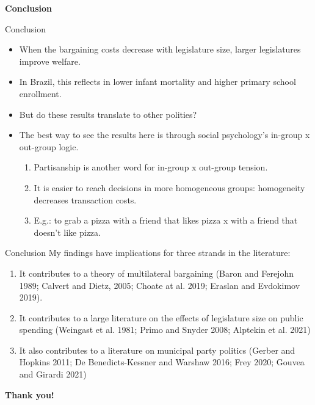 \documentclass[11pt]{beamer}
\begin{document}
\begin{frame}
\begin{center}
\Large{\textbf{Conclusion}}
\end{center}
\end{frame}

\begin{frame}{Conclusion}
\begin{itemize} \itemsep1em
\item When the bargaining costs decrease with legislature size, larger legislatures improve welfare.
\item In Brazil, this reflects in lower infant mortality and higher primary school enrollment. 
\item But do these results translate to other polities?
\item The best way to see the results here is through social psychology's in-group x out-group logic.

\vspace{0.15in}

\begin{enumerate} \itemsep1em
    \item Partisanship is another word for in-group x out-group tension.
    \item It is easier to reach decisions in more homogeneous groups: homogeneity decreases transaction costs.
    \item E.g.: to grab a pizza with a friend that likes pizza x with a friend that doesn't like pizza.
\end{enumerate}
\end{itemize}
\end{frame}

\begin{frame}{Conclusion}
My findings have implications for three strands in the literature:

\vspace{0.15in}

\begin{enumerate} \itemsep1em
    \item It contributes to a theory of multilateral bargaining (Baron and Ferejohn 1989; Calvert and Dietz, 2005; Choate at al. 2019; Eraslan and Evdokimov 2019).
    \item It contributes to a large literature on the effects of legislature size on public spending (Weingast et al. 1981; Primo and Snyder 2008; Alptekin et al. 2021)
    \item It also contributes to a literature on municipal party politics (Gerber and Hopkins 2011; De Benedicts-Kessner and Warshaw 2016; Frey 2020; Gouvea and Girardi 2021)
\end{enumerate}

\end{frame}

\begin{frame}
\begin{center}
\Large{\textbf{Thank you!}}
\end{center}
\end{frame}
\end{document}
